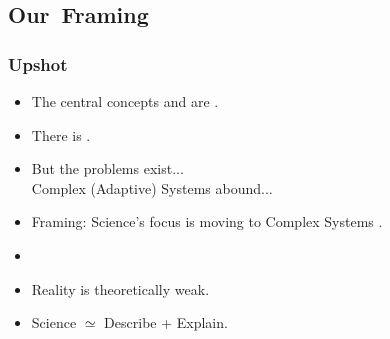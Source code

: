 
\subsection{Our\ Framing}

\begin{frame}
  \frametitle{Upshot}

  \begin{block}{}
  \begin{itemize}
  \item<+->
    The central concepts  and
     are .
  \item<+->
    There is .
  \item<+->
    But the problems exist...\\
    \qquad \qquad Complex (Adaptive) Systems abound...
  \item<+->
    Framing: Science's focus is moving to Complex Systems 
    .
  \item<+->
  \item<+->
    Reality is theoretically weak.
  \item<+->
    Science $\simeq$ Describe + Explain.
  \end{itemize}
  \end{block}

\end{frame}

